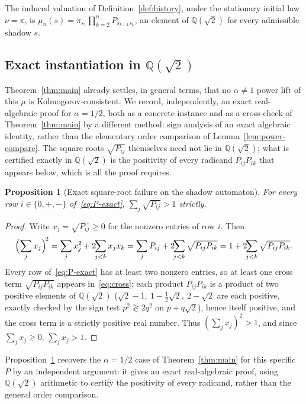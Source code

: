 \documentclass[11pt,a4paper]{article}
\newtheorem{proposition}[theorem]{Proposition}
\theoremstyle{definition}
\theoremstyle{remark}
\newcommand{\Q}{\mathbb{Q}}
\newcommand{\Qroot}{\Q(\sqrt{2})}
\begin{document}
The induced valuation of Definition~\ref{def:history}, under the stationary initial law
$\nu=\pi$, is $\mu_n(s) = \pi_{s_1}\prod_{k=2}^n P_{s_{k-1}s_k}$, an element of $\Qroot$
for every admissible shadow $s$.

\subsection{Exact instantiation in $\Qroot$}
\label{sec:exact-instantiation}

Theorem~\ref{thm:main} already settles, in general terms, that no $\alpha\ne1$ power
lift of this $\mu$ is Kolmogorov-consistent. We record, independently, an exact
real-algebraic proof for $\alpha=1/2$, both as a concrete instance and as a cross-check
of Theorem~\ref{thm:main} by a different method: sign analysis of an exact algebraic
identity, rather than the elementary order comparison of Lemma~\ref{lem:power-compare}.
The square roots $\sqrt{P_{ij}}$ themselves need not lie in $\Qroot$; what is certified
exactly in $\Qroot$ is the positivity of every radicand $P_{ij}P_{ik}$ that appears
below, which is all the proof requires.

\begin{proposition}[Exact square-root failure on the shadow automaton]
  \label{prop:sqrt-fail}
  For every row $i\in\{0,+,-\}$ of~\eqref{eq:P-exact}, $\sum_j \sqrt{P_{ij}} > 1$
  strictly.
\end{proposition}

\begin{proof}
  Write $x_j=\sqrt{P_{ij}}\ge0$ for the nonzero entries of row $i$. Then
  \begin{equation}
    \label{eq:cross}
    \Bigl(\sum_j x_j\Bigr)^{\!2}
    = \sum_j x_j^2 + 2\!\!\sum_{j<k} x_j x_k
    = \sum_j P_{ij} + 2\!\!\sum_{j<k} \sqrt{P_{ij}P_{ik}}
    = 1 + 2\!\!\sum_{j<k} \sqrt{P_{ij}P_{ik}}.
  \end{equation}
  Every row of~\eqref{eq:P-exact} has at least two nonzero entries, so at least one
  cross term $\sqrt{P_{ij}P_{ik}}$ appears in~\eqref{eq:cross}; each product
  $P_{ij}P_{ik}$ is a product of two positive elements of $\Qroot$
  ($\sqrt2-1,\ 1-\tfrac12\sqrt2,\ 2-\sqrt2$ are each positive, exactly checked by the
  sign test $p^2 \gtrless 2q^2$ on $p+q\sqrt2$), hence itself positive, and the cross
  term is a strictly positive real number. Thus $(\sum_j x_j)^2 > 1$, and since
  $\sum_j x_j \ge 0$, $\sum_j x_j > 1$.
\end{proof}

Proposition~\ref{prop:sqrt-fail} recovers the $\alpha=1/2$ case of
Theorem~\ref{thm:main} for this specific $P$ by an independent argument: it gives an
exact real-algebraic proof, using $\Qroot$ arithmetic to certify the positivity of
every radicand, rather than the general order comparison.
\end{document}
